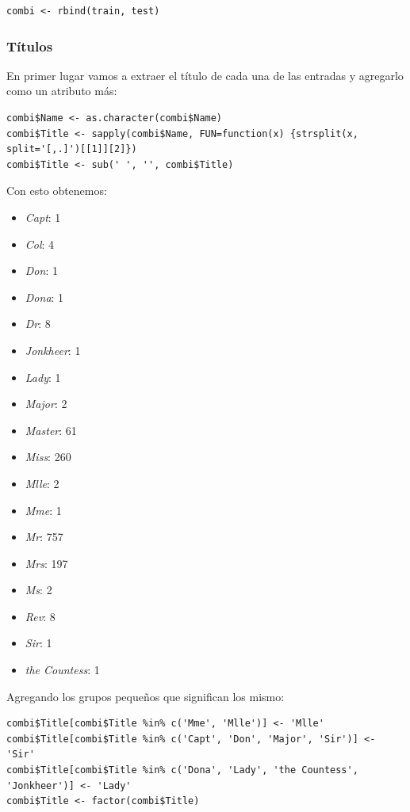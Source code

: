 \begin{lstlisting}[style=R]
combi <- rbind(train, test)
\end{lstlisting}

\subsubsection{Títulos}

En primer lugar vamos a extraer el título de cada una de las entradas y agregarlo como un atributo más:

\begin{lstlisting}[style=R]
combi$Name <- as.character(combi$Name)
combi$Title <- sapply(combi$Name, FUN=function(x) {strsplit(x, split='[,.]')[[1]][2]})
combi$Title <- sub(' ', '', combi$Title)
\end{lstlisting}

Con esto obtenemos:

\begin{itemize}
	\item \textit{Capt}: 1
	\item \textit{Col}: 4
	\item \textit{Don}: 1
	\item \textit{Dona}: 1
	\item \textit{Dr}: 8
	\item \textit{Jonkheer}: 1
	\item \textit{Lady}: 1
	\item \textit{Major}: 2
	\item \textit{Master}: 61
	\item \textit{Miss}: 260
	\item \textit{Mlle}: 2
	\item \textit{Mme}: 1
	\item \textit{Mr}: 757
	\item \textit{Mrs}: 197
	\item \textit{Ms}: 2
	\item \textit{Rev}: 8
	\item \textit{Sir}: 1
	\item \textit{the Countess}: 1
\end{itemize}

Agregando los grupos pequeños que significan los mismo:

\begin{lstlisting}[style=R]
combi$Title[combi$Title %in% c('Mme', 'Mlle')] <- 'Mlle'
combi$Title[combi$Title %in% c('Capt', 'Don', 'Major', 'Sir')] <- 'Sir'
combi$Title[combi$Title %in% c('Dona', 'Lady', 'the Countess', 'Jonkheer')] <- 'Lady'
combi$Title <- factor(combi$Title)
\end{lstlisting}

